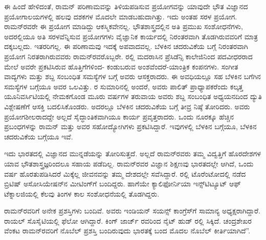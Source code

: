 ಈ ಹಿಂದೆ ಹೇಳಿದಂತೆ, ರಾಮನ್ ಪರಿಣಾಮವನ್ನು ತಿಳಿಯಪಡಿಸುವ ಪ್ರಯೋಗವನ್ನು ಯಾವುದೇ ಭೌತ ವಿಜ್ಞಾನದ ಪ್ರಯೋಗಾಲಯಗಳಲ್ಲಿ ಹಲವು ದಶಕಗಳ ಮೊದಲೇ ಮಾಡಬಹುದಾಗಿತ್ತು. ಇದು ಅಂತಹ ಸರಳ ಪ್ರಯೋಗ. ರಾಮನ್‍ರವರೇ ಈ ಪ್ರಯೋಗ ಮಾಡಿದ್ದು ಆಕಸ್ಮಿಕವೇನಲ್ಲ. ಭೌತಶಾಸ್ತ್ರದಲ್ಲಿನ ಅತಿ ಪ್ರಮುಖ ಸಂಶೋಧನೆಗಳು, ಅದರಲ್ಲಿಯೂ ಅತಿ ಸರಳವೆನ್ನಿಸುವ ಪ್ರಯೋಗಗಳು ವೈಜ್ಞಾನಿಕ ಕಾರ್ಯದಲ್ಲಿ ನಿರಂತರವಾಗಿ ತೊಡಗಿರುವವರಿಗೆ ಮಾತ್ರ ದಕ್ಕಬಲ್ಲದು. ಇತರರಿಗಲ್ಲ. ಈ ಪರಿಣಾಮವು ಇದಕ್ಕೆ ಅಪವಾದವಲ್ಲ. ಬೆಳಕಿನ ಚದರುವಿಕೆಯ ಬಗ್ಗೆ ನಿರಂತರವಾಗಿ ಪ್ರಯೋಗ ನಿರತರಾಗಿರುವವರು ರಾಮನ್‍ರವರೊಬ್ಬರೇ. ರಲ್ಲಿ ಮದರಾಸಿನ ಪ್ರೆಸಿಡೆನ್ಸಿ ಕಾಲೇಜಿನಿಂದ ಪದವೀಧರರಾದ ಮೇಲೆ ಅವರೇ ಪ್ರಕಟಿಸಿರುವ ಹೊತ್ತಿಗೆಗಳಿಂದ- ಕಂಡುಬರುವ ಅಂಶವೆಂದರೆ-ಯಾಂತ್ರಿಕ ಕಂಪನಗಳು. ಸಂಗೀತ ವಾದ್ಯಗಳು ಮತ್ತು ಶಬ್ದ ಸಂಬಂಧಿತ ಸಮಸ್ಯೆಗಳ ಬಗ್ಗೆ ಅವರು ಆಸಕ್ತರಾದರು. ಈ ಅವಧಿಯಲ್ಲೂ ಸಹ ಬೆಳಕಿನ ಬಗೆಗಿನ ಸಮಸ್ಯೆಗಳ ಬಗ್ಗೆಯೂ ಅವರ ಒಲವಿತ್ತು. ರ ಸುಮಾರಿನಲ್ಲಿ ಅಂದರೆ, ಅವರು ಪಾಲಿತ್ ಪ್ರಾಧ್ಯಾಪಕರೆಂದು ಕಲ್ಕತ್ತ ಯೂನಿವರ್ಸಿಟಿಯಲ್ಲಿ ನೇಮಕಗೊಂಡ ಮೂರು ವರ್ಷಗಳ ತರುವಾಯ ಅವರು ಶಬ್ದ ಸಂಬಂಧಿತ ಅಧ್ಯಯನದಿಂದ ದ್ಯುತಿ ವಿಶ್ಲೇಷಣೆಗೆ ಆಸಕ್ತಿ ಬದಲಿಸಿಕೊಂಡರು. ಅದರಲ್ಲೂ ಬೆಳಕಿನ ಚದರುವಿಕೆಯ ಬಗ್ಗೆ ತೀವ್ರ ನಿಷ್ಠೆ ತೋರಿದರು. ಅವರು ಪ್ರಯೋಗಶೀಲರಾದದ್ದೇ ಅಲ್ಲದೆ ಸೈದ್ಧಾಂತಿಕವಾಗಿಯೂ ಕಾರ್ಯ ಪ್ರವೃತ್ತರಾದರು. ಒಂದು ನೂರಕ್ಕೂ ಹೆಚ್ಚಿನ ಪ್ರಬಂಧಗಳನ್ನು ರಾಮನ್ ಮತ್ತು ಅವರ ಸಹೋದ್ಯೋಗಿಗಳು ಪ್ರಕಟಿಸಿದ್ದಾರೆ. ಇವುಗಳಲ್ಲಿ  ಬೆಳಕಿನ ಬಗ್ಗೆಯೂ,  ಬೆಳಕಿನ ಚದರುವಿಕೆಯ ಬಗ್ಗೆಯೂ ಇವೆ.

ಇದು ಭಾರತದಲ್ಲಿ ವಿಜ್ಞಾನದ ಮುನ್ನಡೆಯನ್ನು ತೋರಿಸುತ್ತದೆ. ಅಲ್ಲದೆ ರಾಮನ್‍ರವರು ತಮ್ಮ ವಿದ್ವತ್ತಿಗೆ ಹೊರದೇಶಗಳ ಯಾವ ಭೌತಶಾಸ್ತ್ರಜ್ಞರಿಂದಲೂ ಸಹಾಯ ಪಡೆದಿಲ್ಲ. ರಾಮನ್‍ರವರ ವಿಜ್ಞಾನ ಶಿಕ್ಷಣವು ಭಾರತದಲ್ಲೇ ಆಗಿದೆ, ಒಂದು ವರ್ಷ ಹೊರತುಪಡಿಸಿದರೆ ಮಿಕ್ಕೆಲ್ಲ ಜೀವನವನ್ನು ತಮ್ಮ ದೇಶದಲ್ಲೇ ಸವೆಸಿದ್ದಾರೆ. ರಲ್ಲಿ ಟೊರೆಂಟೋದಲ್ಲಿ ನಡೆದ ಬ್ರಿಟಿಷ್ ಅಸೋಸಿಯೇಷನ್‍ನ ಮೀಟಿಂಗ್‍ಗೆ ಬಂದಿದ್ದರು. ಹಾಗೆಯೇ ಕ್ಯಾಲಿಫೋರ್ನಿಯಾ ಇನ್ಸ್‌ಟಿಟ್ಯೂಟ್ ಆಫ್ ಟೆಕ್ನಾಲಜಿಯಲ್ಲಿ ಕೆಲವು ತಿಂಗಳ ಕಾಲ ಸಂಶೋಧನೆಯಲ್ಲಿ ತೊಡಗಿದ್ದರು.

ರಾಮನ್‍ರವರಿಗೆ ಅನೇಕ ಪ್ರಶಸ್ತಿಗಳು ಬಂದಿವೆ. ಅವರು ಇಂಡಿಯನ್ ಸಯನ್ಸ್ ಕಾಂಗ್ರೆಸ್‍ಗೆ ಸಾಮಾನ್ಯ ಅಧ್ಯಕ್ಷರಾಗಿದ್ದಾರೆ. ರಾಯಲ್ ಸೊಸೈಟಿಯಲ್ಲಿ ಫೆಲೋ ಆಗಿದ್ದಾರೆ. ಕಿಂಗ್ ಜಾರ್ಜ್ ರವರಿಂದ ನೈಟ್ ಹುಡ್ ರಲ್ಲಿ ಸಿಕ್ಕಿದೆ. ಚಂದ್ರಶೇಖರ ವೆಂಕಟ ರಾಮನ್‍ರವರಿಗೆ ನೊಬೆಲ್ ಪ್ರಶಸ್ತಿ ಬಂದಿರುವುದು ಭಾರತಕ್ಕೆ ಬಂದ ಮೊದಲ ನೊಬೆಲ್ ಕೀರ್ತಿಯಾಗಿದೆ”.

